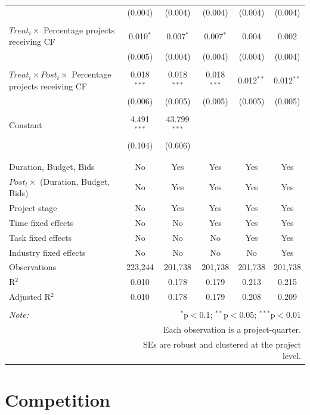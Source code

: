 \documentclass[
]{article}
\begin{document}
\begin{table}[H]
\begin{tabular}{@{\extracolsep{-2pt}}lccccc}
  & (0.004) & (0.004) & (0.004) & (0.004) & (0.004) \\ 
  & & & & & \\ 
 $Treat_i \times$ Percentage projects receiving CF & 0.010$^{*}$ & 0.007$^{*}$ & 0.007$^{*}$ & 0.004 & 0.002 \\ 
  & (0.005) & (0.004) & (0.004) & (0.004) & (0.004) \\ 
  & & & & & \\ 
 $Treat_i \times Post_t \times$ Percentage projects receiving CF & 0.018$^{***}$ & 0.018$^{***}$ & 0.018$^{***}$ & 0.012$^{**}$ & 0.012$^{**}$ \\ 
  & (0.006) & (0.005) & (0.005) & (0.005) & (0.005) \\ 
  & & & & & \\ 
 Constant & 4.491$^{***}$ & 43.799$^{***}$ &  &  &  \\ 
  & (0.104) & (0.606) &  &  &  \\ 
  & & & & & \\ 
\hline \\[-1.8ex] 
Duration, Budget, Bids & No & Yes & Yes & Yes & Yes \\ 
$Post_t \times $  (Duration, Budget, Bids) & No & Yes & Yes & Yes & Yes \\ 
Project stage & No & Yes & Yes & Yes & Yes \\ 
Time fixed effects & No & No & Yes & Yes & Yes \\ 
Task fixed effects & No & No & No & Yes & Yes \\ 
Industry fixed effects & No & No & No & No & Yes \\ 
Observations & 223,244 & 201,738 & 201,738 & 201,738 & 201,738 \\ 
R$^{2}$ & 0.010 & 0.178 & 0.179 & 0.213 & 0.215 \\ 
Adjusted R$^{2}$ & 0.010 & 0.178 & 0.179 & 0.208 & 0.209 \\ 
\hline 
\hline \\[-1.8ex] 
\textit{Note:}  & \multicolumn{5}{r}{$^{*}$p$<$0.1; $^{**}$p$<$0.05; $^{***}$p$<$0.01} \\ 
 & \multicolumn{5}{r}{Each observation is a project-quarter.} \\ 
 & \multicolumn{5}{r}{SEs are robust and clustered at the project level.} \\ 
\end{tabular} 
\end{table}

\hypertarget{competition}{%
\section{Competition}\label{competition}}
\end{document}
